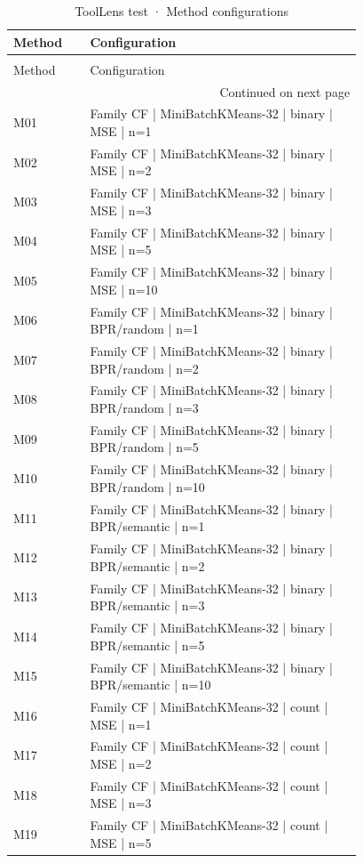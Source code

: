 \begin{longtable}{lp{0.78\linewidth}}
\caption{ToolLens test · Method configurations} \label{tab:ToolLens-test-family-family-methods} \\
\toprule
Method & Configuration \\
\midrule
\endfirsthead
\caption[]{ToolLens test · Method configurations} \\
\toprule
Method & Configuration \\
\midrule
\endhead
\midrule
\multicolumn{2}{r}{Continued on next page} \\
\midrule
\endfoot
\bottomrule
\endlastfoot
M01 & Family CF | MiniBatchKMeans-32 | binary | MSE | n=1 \\
M02 & Family CF | MiniBatchKMeans-32 | binary | MSE | n=2 \\
M03 & Family CF | MiniBatchKMeans-32 | binary | MSE | n=3 \\
M04 & Family CF | MiniBatchKMeans-32 | binary | MSE | n=5 \\
M05 & Family CF | MiniBatchKMeans-32 | binary | MSE | n=10 \\
M06 & Family CF | MiniBatchKMeans-32 | binary | BPR/random | n=1 \\
M07 & Family CF | MiniBatchKMeans-32 | binary | BPR/random | n=2 \\
M08 & Family CF | MiniBatchKMeans-32 | binary | BPR/random | n=3 \\
M09 & Family CF | MiniBatchKMeans-32 | binary | BPR/random | n=5 \\
M10 & Family CF | MiniBatchKMeans-32 | binary | BPR/random | n=10 \\
M11 & Family CF | MiniBatchKMeans-32 | binary | BPR/semantic | n=1 \\
M12 & Family CF | MiniBatchKMeans-32 | binary | BPR/semantic | n=2 \\
M13 & Family CF | MiniBatchKMeans-32 | binary | BPR/semantic | n=3 \\
M14 & Family CF | MiniBatchKMeans-32 | binary | BPR/semantic | n=5 \\
M15 & Family CF | MiniBatchKMeans-32 | binary | BPR/semantic | n=10 \\
M16 & Family CF | MiniBatchKMeans-32 | count | MSE | n=1 \\
M17 & Family CF | MiniBatchKMeans-32 | count | MSE | n=2 \\
M18 & Family CF | MiniBatchKMeans-32 | count | MSE | n=3 \\
M19 & Family CF | MiniBatchKMeans-32 | count | MSE | n=5 \\

\end{longtable}

